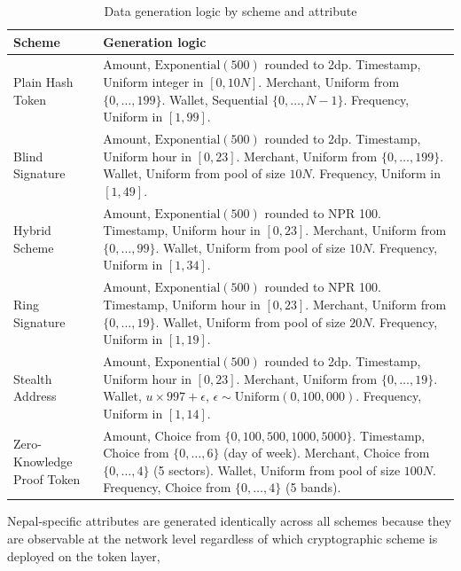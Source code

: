 \begin{table}[H]
\centering
\caption{Data generation logic by scheme and attribute}
\label{tab:data_gen}
\begin{tabular}{lp{8.5cm}}
\toprule
\textbf{Scheme} & \textbf{Generation logic}\\
\midrule
Plain Hash Token &
Amount, $\text{Exponential}(500)$ rounded to 2dp.
Timestamp, Uniform integer in $[0, 10N]$.
Merchant, Uniform from $\{0,\ldots,199\}$.
Wallet, Sequential $\{0,\ldots,N-1\}$.
Frequency, Uniform in $[1, 99]$.\\

Blind Signature &
Amount, $\text{Exponential}(500)$ rounded to 2dp.
Timestamp, Uniform hour in $[0, 23]$.
Merchant, Uniform from $\{0,\ldots,199\}$.
Wallet, Uniform from pool of size $10N$.
Frequency, Uniform in $[1, 49]$.\\

Hybrid Scheme &
Amount, $\text{Exponential}(500)$ rounded to NPR 100.
Timestamp, Uniform hour in $[0, 23]$.
Merchant, Uniform from $\{0,\ldots,99\}$.
Wallet, Uniform from pool of size $10N$.
Frequency, Uniform in $[1, 34]$.\\

Ring Signature &
Amount, $\text{Exponential}(500)$ rounded to NPR 100.
Timestamp, Uniform hour in $[0, 23]$.
Merchant, Uniform from $\{0,\ldots,19\}$.
Wallet, Uniform from pool of size $20N$.
Frequency, Uniform in $[1, 19]$.\\

Stealth Address &
Amount, $\text{Exponential}(500)$ rounded to 2dp.
Timestamp, Uniform hour in $[0, 23]$.
Merchant, Uniform from $\{0,\ldots,19\}$.
Wallet, $u \times 997 + \epsilon$, $\epsilon \sim
\text{Uniform}(0, 100{,}000)$.
Frequency, Uniform in $[1, 14]$.\\

Zero-Knowledge Proof Token &
Amount, Choice from $\{0, 100, 500, 1000, 5000\}$.
Timestamp, Choice from $\{0,\ldots,6\}$ (day of week).
Merchant, Choice from $\{0,\ldots,4\}$ (5 sectors).
Wallet, Uniform from pool of size $100N$.
Frequency, Choice from $\{0,\ldots,4\}$ (5 bands).\\
\bottomrule
\end{tabular}
\end{table}

Nepal-specific attributes are generated identically across
all schemes because they are observable at the network level
regardless of which cryptographic scheme is deployed on the
token layer,

